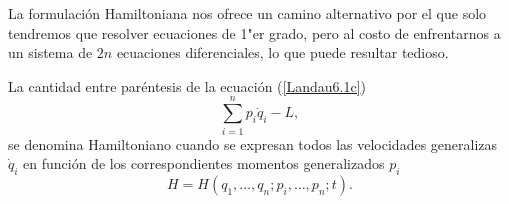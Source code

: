 \documentclass[12pt,spanish,a4paper]{article}
\begin{document}
La formulación Hamiltoniana nos ofrece un camino alternativo por el que solo tendremos que resolver ecuaciones de 1"er grado, pero al costo de enfrentarnos a un sistema de \(2n\) ecuaciones diferenciales, lo que puede resultar tedioso.

La cantidad entre paréntesis de la ecuación (\ref{Landau6.1c}) 
\begin{equation}\label{Lanczos62.3}
	\sum_{i=1}^n p_i \dot{q}_i - L ,
    \tag{Lanczos 62.3}
\end{equation}
se denomina Hamiltoniano cuando se expresan todos las velocidades generalizas \(\dot{q}_i\) en función de los correspondientes momentos generalizados \(p_i\)
\begin{equation}\label{Lanczos62.4}
	H =  H(q_1,\ldots, q_n;p_i, \ldots, p_n; t) .
    \tag{Lanczos 62.4}
\end{equation}
\end{document}
